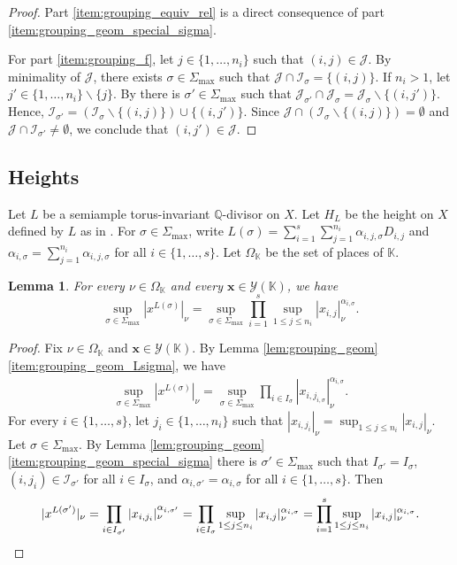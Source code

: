 \documentclass[10pt, a4paper, reqno, english]{amsart}
\newcommand\QQ{\mathbb{Q}}
\newcommand{\KK}{\mathbb{K}} %
\newcommand{\ic}[1]{\mathcal{I}_{#1}} %
\newtheorem{lemma}[theorem]{Lemma}
\theoremstyle{definition}
\numberwithin{theorem}{section}
\numberwithin{equation}{section}
\begin{document}
\begin{proof}
Part \ref{item:grouping_equiv_rel} is a direct consequence of part \ref{item:grouping_geom_special_sigma}.

For part \ref{item:grouping_f},
let $j\in\{1,\dots,n_i\}$ such that $(i,j)\in\mathcal J$. By minimality of $\mathcal J$, there exists $\sigma\in\Sigma_{\max}$ such that $\mathcal J\cap\mathcal I_\sigma=\{(i,j)\}$. If $n_i>1$, let $j'\in\{1,\dots,n_i\}\smallsetminus\{j\}$. By \cite[Lemma 8.9]{MR1679841} there is $\sigma'\in\Sigma_{\max}$ such that $\mathcal J_{\sigma'}\cap\mathcal J_\sigma=\mathcal J_\sigma\smallsetminus\{(i,j')\}$. Hence, $\mathcal I_{\sigma'}=(\mathcal I_\sigma\smallsetminus\{(i,j)\})\cup\{(i,j')\}$. Since $\mathcal J\cap (\mathcal I_\sigma\smallsetminus\{(i,j)\})=\emptyset$ and $\mathcal J\cap\mathcal I_{\sigma'}\neq\emptyset$, we conclude that $(i,j')\in\mathcal J$.
\end{proof}

\subsection{Heights}
\label{sec:heights}

Let $L$ be a semiample torus-invariant $\QQ$-divisor on $X$. Let $H_L$ be the height on $X$ defined by $L$ as in \cite[\S 6.3]{hypmethod}. For $\sigma\in\Sigma_{\max}$, write $L(\sigma)=\sum_{i=1}^s\sum_{j=1}^{n_i}\alpha_{i,j,\sigma}D_{i,j}$ and $\alpha_{i,\sigma}=\sum_{j=1}^{n_i}\alpha_{i,j,\sigma}$ for all $i\in\{1,\dots,s\}$. Let $\Omega_{\KK}$ be the set of places of $\KK$.

\begin{lemma}
\label{lem:height}
For every $\nu\in\Omega_{\KK}$ and every $\mathbf x\in \mathscr Y(\KK)$, we have 
$$
\sup_{\sigma\in\Sigma_{\max}}|x^{L(\sigma)}|_\nu=\sup_{\sigma\in\Sigma_{\max}}\prod_{i=1}^s\sup_{1\leq j\leq n_i}|x_{i,j}|_\nu^{\alpha_{i,\sigma}}.
$$
\end{lemma}
\begin{proof}
Fix $\nu\in\Omega_{\KK}$ and $\mathbf x\in \mathscr Y(\KK)$.
By Lemma \ref{lem:grouping_geom}\ref{item:grouping_geom_Lsigma}, we have
\begin{gather*} 
 \sup_{\sigma\in\Sigma_{\max}}|x^{L(\sigma)}|_\nu=\sup_{\sigma\in\Sigma_{\max}}\prod_{i\in I_\sigma}|x_{i,{j_{i,\sigma}}}|_\nu^{\alpha_{i,\sigma}}. 
\end{gather*}
For every $i\in\{1,\dots,s\}$, let $j_i\in\{1,\dots,n_{i}\}$ such that $|x_{i,j_i}|_\nu=\sup_{1\leq j\leq n_{i}}|x_{i,j}|_\nu$.
Let $\sigma\in\Sigma_{\max}$. By Lemma \ref{lem:grouping_geom}\ref{item:grouping_geom_special_sigma} there is $\sigma'\in\Sigma_{\max}$ such that $I_{\sigma'}=I_\sigma$, $(i,j_i)\in\ic{\sigma'}$ for all $i\in I_\sigma$, and $\alpha_{i,\sigma'}=\alpha_{i,\sigma}$ for all $i\in\{1,\dots,s\}$.
Then 
\begin{equation*}
|x^{L(\sigma')}|_\nu=\prod_{i\in I_{\sigma'}}|x_{i,j_i}|_\nu^{\alpha_{i,\sigma'}}=\prod_{i\in I_\sigma}\sup_{1\leq j\leq n_{i}}|x_{i,j}|_\nu^{\alpha_{i,\sigma}}=\prod_{i=1}^s\sup_{1\leq j\leq n_{i}}|x_{i,j}|_\nu^{\alpha_{i,\sigma}}.
\qedhere
\end{equation*}
\end{proof}
\end{document}
